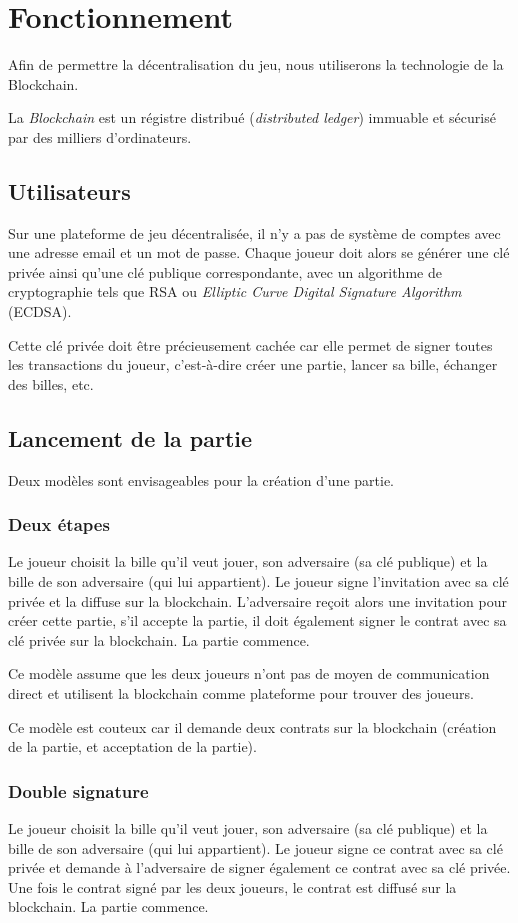 \documentclass{article}
\begin{document}
\section{Fonctionnement}
Afin de permettre la décentralisation du jeu, nous utiliserons la technologie de la Blockchain.

La \textit{Blockchain} est un régistre distribué (\textit{distributed ledger}) immuable et sécurisé par des milliers d'ordinateurs.

\subsection{Utilisateurs}
Sur une plateforme de jeu décentralisée, il n'y a pas de système de comptes avec une adresse email et un mot de passe.
Chaque joueur doit alors se générer une clé privée ainsi qu'une clé publique correspondante, avec un algorithme de cryptographie tels que RSA ou \textit{Elliptic Curve Digital Signature Algorithm} (ECDSA).

Cette clé privée doit être précieusement cachée car elle permet de signer toutes les transactions du joueur, c'est-à-dire créer une partie, lancer sa bille, échanger des billes, etc.

\subsection{Lancement de la partie}
Deux modèles sont envisageables pour la création d'une partie.
\subsubsection{Deux étapes}
Le joueur choisit la bille qu'il veut jouer, son adversaire (sa clé publique) et la bille de son adversaire (qui lui appartient). Le joueur signe l'invitation avec sa clé privée et la diffuse sur la blockchain. L'adversaire reçoit alors une invitation pour créer cette partie, s'il accepte la partie, il doit également signer le contrat avec sa clé privée sur la blockchain. La partie commence.

Ce modèle assume que les deux joueurs n'ont pas de moyen de communication direct et utilisent la blockchain comme plateforme pour trouver des joueurs.

Ce modèle est couteux car il demande deux contrats sur la blockchain (création de la partie, et acceptation de la partie).


\subsubsection{Double signature}
Le joueur choisit la bille qu'il veut jouer, son adversaire (sa clé publique) et la bille de son adversaire (qui lui appartient). Le joueur signe ce contrat avec sa clé privée et demande à l'adversaire de signer également ce contrat avec sa clé privée. Une fois le contrat signé par les deux joueurs, le contrat est diffusé sur la blockchain. La partie commence.
\end{document}
